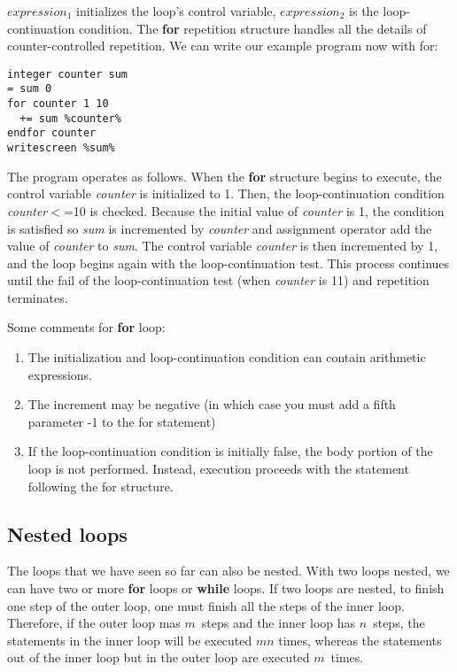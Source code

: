 \documentclass[a4paper,12pt]{book}
\begin{document}
$expression_1$ initializes the loop's control variable, $expression_2$ is the loop-continuation condition. The {\bf for} repetition structure handles all the details of counter-controlled repetition. We can write our example program now with for:
\noindent
\begin{verbatim}
integer counter sum
= sum 0
for counter 1 10
  += sum %counter%
endfor counter
writescreen %sum%
\end{verbatim}
\noindent

The program operates as follows. When the {\bf for} structure begins to execute, the control variable \textsl{counter} is initialized to 1.  Then, the loop-continuation condition \textsl{counter}$<$=10 is checked.  Because the initial value of \textsl{counter} is 1, the condition is satisfied so \textsl{sum} is incremented by \textsl{counter} and assignment operator add the value of \textsl{counter} to \textsl{sum}.  The control variable \textsl{counter} is then incremented by 1, and the loop begins again with the loop-continuation test.  This process continues until the fail of the loop-continuation test (when \textsl{counter} is 11) and repetition terminates.

Some comments for {\bf for} loop:
\begin{enumerate}
\item The initialization and loop-continuation condition can contain arithmetic expressions.
\item The increment may be negative (in which case you must add a fifth parameter -1 to the for statement)
\item If the loop-continuation condition is initially false, the body portion of the loop is not performed. Instead, execution proceeds with the statement following the for structure.
\end{enumerate}

\subsection{Nested loops}
The loops that we have seen so far can also be nested. With two loops nested, we can have two or more {\bf for} loops or {\bf while} loops. If two loops are nested, to finish one step of the outer loop, one must finish all the steps of the inner loop. Therefore, if the outer loop mas $m$ steps and the inner loop has $n$ steps, the statements in the inner loop will be executed $mn$ times, whereas the statements out of the inner loop but in the outer loop are executed $m$ times.
\end{document}
